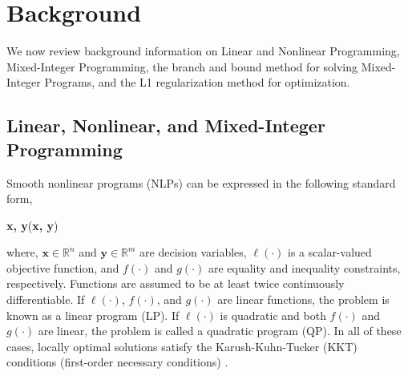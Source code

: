 
\section{Background} \label{sec:capo:background}
We now review background information on Linear and Nonlinear Programming, Mixed-Integer Programming, the branch and bound method for solving Mixed-Integer Programs, and the L1 regularization method for optimization. 
\subsection{{Linear, Nonlinear, and Mixed-Integer Programming}}
Smooth nonlinear programs (NLPs) can be expressed in the following standard form,
\begin{mini!}
{\textbf{x, y}}{\ell(\textbf{x, y})}
{\label{eq:optimization}}{}
\end{mini!}
where, $\textbf{x} \in \mathbb{R}^n$ and $\textbf{y} \in \mathbb{R}^m$ are decision variables, $\ell(\cdot)$ is a scalar-valued objective function, and $f(\cdot)$ and $g(\cdot)$ are equality and inequality constraints, respectively. Functions are assumed to be at least twice continuously differentiable.
If $\ell(\cdot)$, $f(\cdot)$, and $g(\cdot)$ are linear functions, the problem is known as a linear program (LP). If $\ell(\cdot)$ is quadratic and both $f(\cdot)$ and $g(\cdot)$ are linear, the problem is called a quadratic program (QP). In all of these cases, locally optimal solutions satisfy the Karush-Kuhn-Tucker (KKT) conditions (first-order necessary conditions) \cite{kuhn1950kkt}. %


